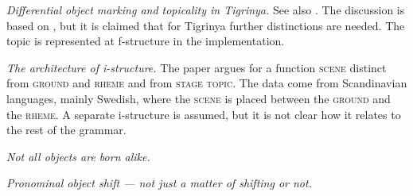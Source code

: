 \documentclass[output=paper,hidelinks]{langscibook}
\begin{document}
\vspace{+6pt} 
\citet{Kifle07} \textit{Differential object marking and topicality in Tigrinya.} See also \citet{Kifle11}. The discussion is based on \citet{DN05}, but it is claimed that for Tigrinya further distinctions are needed. The topic is represented at f-structure in the implementation.


\vspace{+6pt}
\citet{A07} \textit{The architecture of i-structure.} The paper argues for a function \textsc{scene} distinct from \textsc{ground} and \textsc{rheme} and from \textsc{stage topic}. The data come from Scandinavian languages, mainly Swedish, where the \textsc{scene} is placed between the \textsc{ground} and the \textsc{rheme}. A separate i-structure is assumed, but it is not clear how it relates to the rest of the grammar. 


\vspace{+6pt}
\citet{A08} \textit{Not all objects are born alike.} 

\citet{A09} \textit{Pronominal object shift --- not just a matter of shifting or not. }
\end{document}
